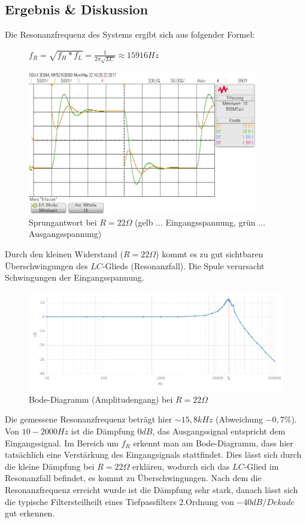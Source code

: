 \documentclass[12pt,a4paper,titlepage]{article}
\begin{document}
\subsection{Ergebnis \& Diskussion}
Die Resonanzfrequenz des Systems ergibt sich aus folgender Formel:
\begin{figure}[H]
  \centering
  $f_R = \sqrt{f_H*f_L} = \frac{1}{2\pi\sqrt{LC}} \approx 15916Hz$
\end{figure}

\begin{figure}[H]
  \centering
  \includegraphics[width=100mm]{sprungantwort_rlc_22.png}
  \caption{Sprungantwort bei $R=22\Omega$ (gelb $\hdots$ Eingangsspannung, gr\"un $\hdots$ Ausgangsspannung)}
\end{figure}
\noindent Durch den kleinen Widerstand ($R=22\Omega$) kommt es zu gut sichtbaren \"Uberschwingungen des $LC$-Glieds (Resonanzfall). Die Spule verursacht Schwingungen der Eingangsspannung.

\begin{figure}[H]
  \centering
  \includegraphics[width=150mm]{bode_rlc_22.png}
  \caption{Bode-Diagramm (Amplitudengang) bei $R=22\Omega$}
\end{figure}
\noindent Die gemessene Resonanzfrequenz betr\"agt hier $\sim15,8kHz$ (Abweichung $-0,7\%$). Von $10-2000Hz$ ist die Dämpfung $0dB$, das Ausgangssignal entspricht dem Eingangssignal. Im Bereich um $f_R$ erkennt man am Bode-Diagramm, dass hier tats\"achlich eine Verstärkung des Eingangsignals stattfindet. Dies lässt sich durch die kleine Dämpfung bei $R=22\Omega$ erkl\"aren, wodurch sich das $LC$-Glied im Resonanzfall befindet, es kommt zu \"Uberschwingungen. Nach dem die Resonanzfrequenz erreicht wurde ist die D\"ampfung sehr stark, danach l\"asst sich die typische Filtersteilheilt eines Tiefpassfilters 2.Ordnung von $-40dB/Dekade$ gut erkennen.
\end{document}
